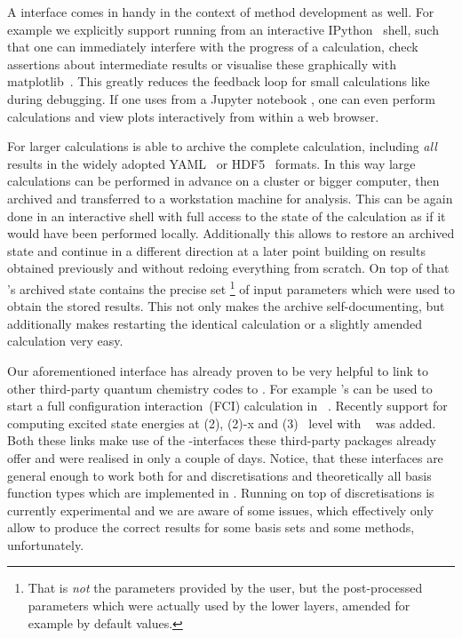 A \python interface comes in handy in the context of method development as well.
For example we explicitly support running \molsturm from an interactive
IPython~ shell,
such that one can immediately interfere with the progress of a calculation,
check assertions about intermediate results
or visualise these graphically with matplotlib~.
This greatly reduces the feedback loop for small calculations
like during debugging.
If one uses \molsturm from a Jupyter notebook \cite{Jupyter},
one can even perform calculations and view plots
interactively from within a web browser.

For larger calculations \molsturm is able to archive the complete
calculation,
including \emph{all} \SCF results in
the widely adopted YAML~\cite{Ben-Kiki2009} or HDF5~\cite{HDF5Manual} formats.
In this way large calculations can be performed in advance
on a cluster or bigger computer,
then archived and transferred to a workstation machine
for analysis.
This can be again done in an interactive shell
with full access to the state of the calculation
as if it would have been performed locally.
Additionally this allows to restore an archived state
and continue in a different direction at a later point
building on results obtained previously
and without redoing everything from scratch.
On top of that \molsturm's archived state contains
the precise set%
\footnote{That is \emph{not} the parameters provided by the user,
but the post-processed parameters which were actually used
by the lower layers, amended for example by default values.}
of input parameters which were used to obtain the stored results.
This not only makes the archive self-documenting,
but additionally makes restarting the identical calculation
or a slightly amended calculation very easy.

Our aforementioned \numpy interface has already proven to be very helpful
to link to other third-party quantum chemistry codes to \molsturm.
For example \molsturm's \SCF can be used to start a
full configuration interaction~(FCI) calculation
in \pyscf~\cite{Sun2017}.
Recently support for computing excited state energies at \ADC(2),
\ADC(2)-x and \ADC(3)~\cite{Schirmer1982,Trofimov1999} level
with \adcman~\cite{Wormit2014} was added.
Both these links make use of the \python-\numpy interfaces
these third-party packages already offer and were realised in only a couple of days.
Notice, that these interfaces
are general enough to work both for \CS and \cGTO discretisations
and theoretically all basis function types which are implemented in \gint.
Running \adcman on top of \CS discretisations
is currently experimental and we are aware of some issues,
which effectively only allow to produce the correct results
for some \CS basis sets and some \ADC methods, unfortunately.

